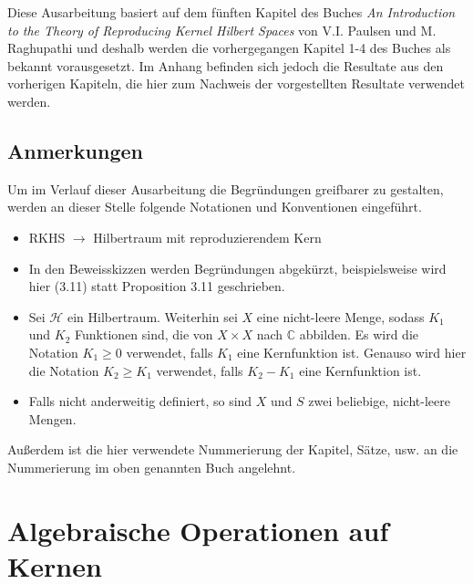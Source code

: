 \documentclass[12pt,titlepage,twoside,cleardoublepage]{article}
\theoremstyle{nummermitklammern}
\numberwithin{equation}{section}
\begin{document}
Diese Ausarbeitung basiert auf dem fünften Kapitel des Buches \emph{An Introduction to the Theory of Reproducing Kernel Hilbert Spaces} von  V.I. Paulsen und M. Raghupathi und deshalb werden die vorhergegangen Kapitel 1-4 des Buches als bekannt vorausgesetzt. Im Anhang befinden sich jedoch die Resultate aus den vorherigen Kapiteln, die hier zum Nachweis der vorgestellten Resultate verwendet werden. 
\subsection*{Anmerkungen}
Um im Verlauf dieser Ausarbeitung die Begründungen greifbarer zu gestalten, werden an dieser Stelle folgende Notationen  und Konventionen eingeführt.
\begin{itemize}
\item RKHS $\rightarrow$ Hilbertraum mit reproduzierendem Kern
\item In den Beweisskizzen werden Begründungen abgekürzt, beispielsweise wird hier (3.11) statt Proposition 3.11 geschrieben.
\end{itemize} 
\begin{itemize}
\item Sei $\mathcal{H}$ ein Hilbertraum. Weiterhin sei $X$ eine nicht-leere Menge, sodass $K_1$ und $K_2$ Funktionen sind, die von $X\times X$ nach $\mathbb{C}$ abbilden. 
Es wird die Notation $K_1\geq 0 $ verwendet, falls $K_1$ eine Kernfunktion ist. Genauso wird hier die Notation $K_2\geq K_1$ verwendet, falls $K_2-K_1$ eine Kernfunktion ist. 
\item Falls nicht anderweitig definiert, so sind $X$ und $S$ zwei beliebige, nicht-leere Mengen.
\end{itemize}
Außerdem ist die hier verwendete Nummerierung der Kapitel, Sätze, usw. an die Nummerierung im oben genannten Buch angelehnt. 
\section{Algebraische Operationen auf Kernen}
\end{document}

